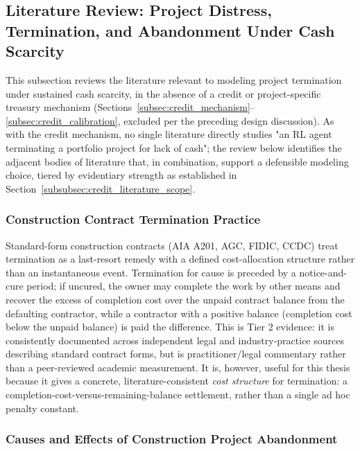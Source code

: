 \subsection{Literature Review: Project Distress, Termination, and Abandonment Under Cash Scarcity}
\label{subsec:distress_literature}

This subsection reviews the literature relevant to modeling project termination under sustained cash scarcity, in the absence of a credit or project-specific treasury mechanism (Sections~\ref{subsec:credit_mechanism}--\ref{subsec:credit_calibration}, excluded per the preceding design discussion). As with the credit mechanism, no single literature directly studies "an RL agent terminating a portfolio project for lack of cash"; the review below identifies the adjacent bodies of literature that, in combination, support a defensible modeling choice, tiered by evidentiary strength as established in Section~\ref{subsubsec:credit_literature_scope}.

\subsubsection{Construction Contract Termination Practice}
\label{subsubsec:lit_contract_termination}

Standard-form construction contracts (AIA A201, AGC, FIDIC, CCDC) treat termination as a last-resort remedy with a defined cost-allocation structure rather than an instantaneous event. Termination for cause is preceded by a notice-and-cure period; if uncured, the owner may complete the work by other means and recover the excess of completion cost over the unpaid contract balance from the defaulting contractor, while a contractor with a positive balance (completion cost below the unpaid balance) is paid the difference. This is Tier 2 evidence: it is consistently documented across independent legal and industry-practice sources describing standard contract forms, but is practitioner/legal commentary rather than a peer-reviewed academic measurement. It is, however, useful for this thesis because it gives a concrete, literature-consistent \emph{cost structure} for termination: a completion-cost-versus-remaining-balance settlement, rather than a single ad hoc penalty constant.

\subsubsection{Causes and Effects of Construction Project Abandonment}
\label{subsubsec:lit_abandonment}

